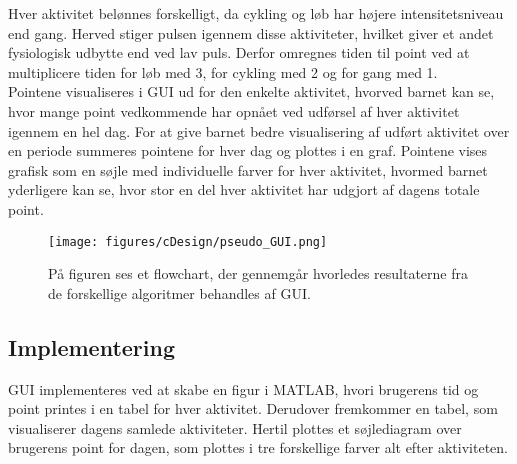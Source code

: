 Hver aktivitet belønnes forskelligt, da cykling og løb har højere intensitetsniveau end gang. Herved stiger pulsen igennem disse aktiviteter, hvilket giver et andet fysiologisk udbytte end ved lav puls. Derfor omregnes tiden til point ved at multiplicere tiden for løb med 3, for cykling med 2 og for gang med 1.\\ 
Pointene visualiseres i GUI ud for den enkelte aktivitet, hvorved barnet kan se, hvor mange point vedkommende har opnået ved udførsel af hver aktivitet igennem en hel dag. For at give barnet bedre visualisering af udført aktivitet over en periode summeres pointene for hver dag og plottes i en graf. Pointene vises grafisk som en søjle med individuelle farver for hver aktivitet, hvormed barnet yderligere kan se, hvor stor en del hver aktivitet har udgjort af dagens totale point.  
\begin{figure}[H]
	\centering
	\texttt{[image: figures/cDesign/pseudo\_GUI.png]}
	\caption{På figuren ses et flowchart, der gennemgår hvorledes resultaterne fra de forskellige algoritmer behandles af GUI.}
	\label{fig:GUI}
\end{figure}

\subsection{Implementering}
GUI implementeres ved at skabe en figur i MATLAB, hvori brugerens tid og point printes i en tabel for hver aktivitet. Derudover fremkommer en tabel, som visualiserer dagens samlede aktiviteter. Hertil plottes et søjlediagram over brugerens point for dagen, som plottes i tre forskellige farver alt efter aktiviteten. %


